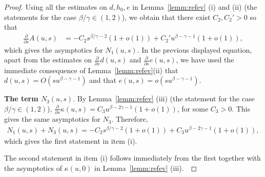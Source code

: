 \documentclass[10pt,a4paper]{amsart}
\begin{document}
\begin{proof}
Using all the estimates on $d, h_0, e$ in Lemma~\ref{lemm:refev} (i) and (ii) (the statements for the case $\beta/\gamma\in (1,2)$),
we obtain that there exist $C_2, C_2'>0$ so that
\begin{align*}
\frac{\partial}{\partial s} A(u,s)&=-C_2 s^{\beta/\gamma-2}(1+o(1)) + C_2' u^{\beta-\gamma-1}(1+o(1)),
\end{align*}
which gives the asymptotics for $N_1(u,s)$.
In the previous displayed equation, apart from the estimates on $\frac{\partial}{\partial s} d(u,s)$ and  $\frac{\partial}{\partial s} e(u,s)$, we have used the immediate consequence of 
 Lemma~\ref{lemm:refev}(ii) that $d(u,s)=O(s u^{\beta-\gamma-1})$ and that $ e(u,s)= o(s u^{\beta-\gamma-1})$.
 
 \textbf{The term $N_3(u,s)$}. By Lemma~\ref{lemm:refev} (iii) (the statement for the case $\beta/\gamma\in (1,2)$),
 $\frac{\partial}{\partial s}\kappa(u,s)=C_3 u^{\beta-2\gamma-1}(1+o(1))$, for some $C_3>0$. This gives the same asymptotics for $N_3$. Therefore,
\begin{align*}
N_1(u,s)+N_3(u,s)=-C_2 s^{\beta/\gamma-2}(1+o(1))+C_3 u^{\beta-2\gamma-1}(1+o(1)),\end{align*}
which gives the first statement in item (i).

The second statement in item (i) follows immediately from the first together with the asymptotics of $\kappa(u,0)$ in Lemma~\ref{lemm:refev} (iii).~\end{proof}
\end{document}
